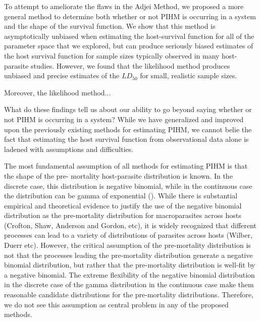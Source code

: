\documentclass[12pt, a4paper]{article}
\begin{document}
To attempt to ameliorate the flaws in the Adjei Method, we proposed a more
general method to determine both whether or not PIHM is occurring in a system
and the shape of the survival function.  We show that this method is
asymptotically unbiased when estimating the host-survival function for all of
the parameter space that we explored, but can produce seriously biased
estimates of the host survival function for sample sizes typically observed in
many host-parasite studies.  However, we found that the likelihood method
produces unbiased and precise estimates of the $LD_{50}$ for small, realistic
sample sizes.

Moreover, the likelihood method...


What do these findings tell us about our ability to go beyond saying whether or
not PIHM is occurring in a system?  While we have generalized and improved upon
the previously existing methods for estimating PIHM, we cannot belie the fact
that estimating the host survival function from observational data alone is
ladened with assumptions and difficulties.

The most fundamental
assumption of all methods for estimating PIHM is that the shape of the pre-
mortality host-parasite distribution is known. In the discrete case, this
distribution is negative binomial, while in the continuous case the distribution can be gamma of exponential (\citep{Ferguson2011}).  While there is substantial empirical and
theoretical evidence to justify the use of the negative binomial distribution
as the pre-mortality distribution for macroparasites across hosts (Crofton, Shaw, Anderson and Gordon, etc), it is widely recognized that different processes can lead to a variety of distributions of parasites across hosts (Wilber, Duerr etc).  However, the critical assumption of the pre-mortality distribution is not that the processes leading the pre-mortality distribution generate a negative binomial distribution, but rather that the pre-mortality distribution is well-fit by a negative binomial. The extreme flexibility of the negative binomial distribution in the discrete case of the gamma distribution in the continuous case make them reasonable candidate distributions for the pre-mortality distributions.  Therefore, we do not see this assumption as central problem in any of the proposed methods.
\end{document}

